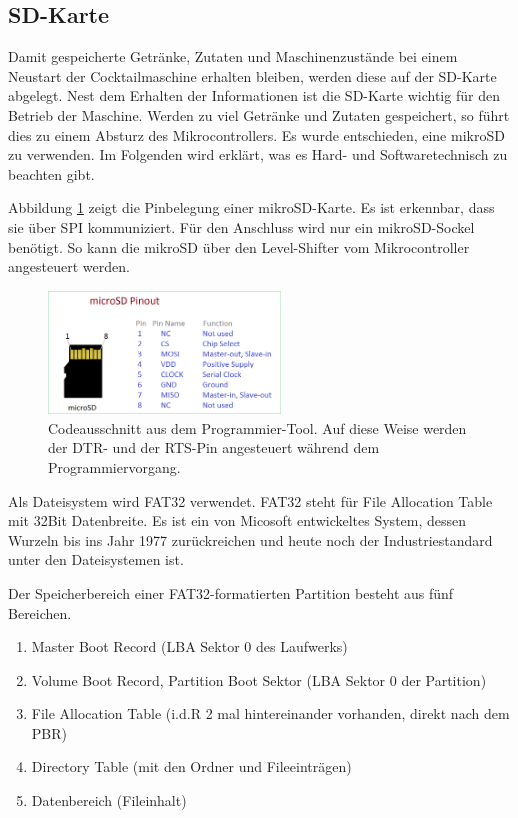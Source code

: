 \subsection{SD-Karte}
\label{subsec:SD_Karte}

Damit gespeicherte Getränke, Zutaten und Maschinenzustände bei einem Neustart der Cocktailmaschine erhalten bleiben, werden diese auf der SD-Karte abgelegt. Nest dem Erhalten der Informationen ist die SD-Karte wichtig für den Betrieb der Maschine. Werden zu viel Getränke und Zutaten gespeichert, so führt dies zu einem Absturz des Mikrocontrollers. Es wurde entschieden, eine mikroSD zu verwenden. Im Folgenden wird erklärt, was es Hard- und Softwaretechnisch zu beachten gibt.

Abbildung \ref{fig:micro_sd_pinout} zeigt die Pinbelegung einer mikroSD-Karte. Es ist erkennbar, dass sie über SPI kommuniziert. Für den Anschluss wird nur ein mikroSD-Sockel benötigt. So kann die mikroSD über den Level-Shifter vom Mikrocontroller angesteuert werden.

\begin{figure}[h!]
	\centering
	\includegraphics[width=0.55\textwidth]{graphics/micro-sd-pinout}
	\caption{Codeausschnitt aus dem Programmier-Tool. Auf diese Weise werden der DTR- und der RTS-Pin angesteuert während dem Programmiervorgang.}
	\label{fig:micro_sd_pinout}
\end{figure}


Als Dateisystem wird FAT32 verwendet. FAT32 steht für File Allocation Table mit 32Bit Datenbreite. Es ist ein von Micosoft entwickeltes System, dessen Wurzeln bis ins Jahr 1977 zurückreichen und heute noch der Industriestandard unter den Dateisystemen ist.


Der Speicherbereich einer FAT32-formatierten Partition besteht aus fünf Bereichen.
\begin{enumerate}
\item Master Boot Record (LBA Sektor 0 des Laufwerks)
\item Volume Boot Record, Partition Boot Sektor (LBA Sektor 0 der Partition)
\item File Allocation Table (i.d.R 2 mal hintereinander vorhanden, direkt nach dem PBR)
\item Directory Table (mit den Ordner und Fileeinträgen)
\item Datenbereich (Fileinhalt)
\end{enumerate}

